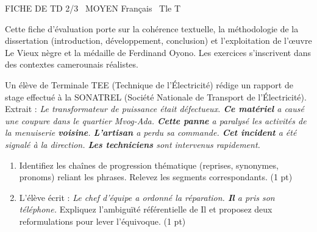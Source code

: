 \documentclass[11pt]{article}
\begin{document}
\pagestyle{empty}

\begin{tcolorbox}[enhanced,colback=popink,colframe=popink,arc=10pt,boxrule=0pt,left=12pt,right=12pt,top=9pt,bottom=9pt]
{\color{white}\popxbold\small FICHE DE TD 2/3 \textbullet\ MOYEN \hfill Français \textbullet\ Tle T\par}
\end{tcolorbox}
\vspace{4pt}

\noindent Cette fiche d'évaluation porte sur la cohérence textuelle, la méthodologie de la dissertation (introduction, développement, conclusion) et l'exploitation de l'œuvre \og Le Vieux nègre et la médaille \fg{} de Ferdinand Oyono. Les exercices s'inscrivent dans des contextes camerounais réalistes.

\begin{exercice}
Un élève de Terminale TEE (Technique de l'Électricité) rédige un rapport de stage effectué à la SONATREL (Société Nationale de Transport de l'Électricité). Extrait :
\og \textit{Le transformateur de puissance était défectueux. \textbf{Ce matériel} a causé une coupure dans le quartier Mvog-Ada. \textbf{Cette panne} a paralysé les activités de la menuiserie \textbf{voisine}. \textbf{L'artisan} a perdu sa commande. \textbf{Cet incident} a été signalé à la direction. \textbf{Les techniciens} sont intervenus rapidement.}\fg{}
\begin{enumerate}
    \item Identifiez les chaînes de progression thématique (reprises, synonymes, pronoms) reliant les phrases. Relevez les segments correspondants. (1 pt)
    \item L'élève écrit : \og \textit{Le chef d'équipe a ordonné la réparation. \textbf{Il} a pris son téléphone.}\fg{} Expliquez l'ambiguïté référentielle de \og Il \fg{} et proposez deux reformulations pour lever l'équivoque. (1 pt)
\end{enumerate}
\end{exercice}
\end{document}
